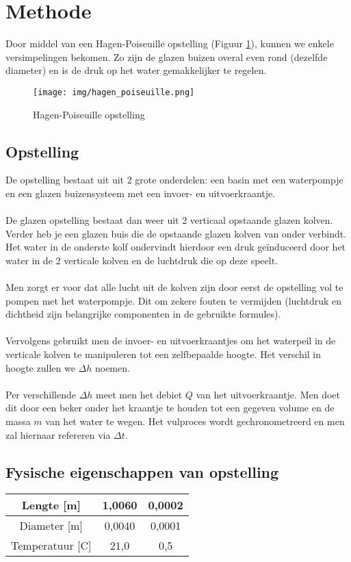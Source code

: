 \section{Methode}

Door middel van een Hagen-Poiseuille opstelling
(Figuur \ref{fig:hagen-pois}), kunnen we enkele
versimpelingen bekomen. Zo zijn de glazen buizen
overal even rond (dezelfde diameter) en is de druk
op het water gemakkelijker te regelen.

\begin{figure}[h]
    \centering
    \caption{Hagen-Poiseuille opstelling}
    \texttt{[image: img/hagen\_poiseuille.png]}
    \label{fig:hagen-pois}
\end{figure}

\subsection{Opstelling}

De opstelling bestaat uit uit 2 grote onderdelen: een basin
met een waterpompje en een glazen buizensysteem met
een invoer- en uitvoerkraantje.
\\ \\
De glazen opstelling bestaat dan weer uit 2 verticaal
opstaande glazen kolven. Verder heb je een glazen buis
die de opstaande glazen kolven van onder verbindt.
Het water in de onderste kolf ondervindt hierdoor een druk
geïnduceerd door het water in de 2 verticale kolven en de
luchtdruk die op deze speelt.
\\ \\
Men zorgt er voor dat alle lucht uit de kolven zijn door
eerst de opstelling vol te pompen met het waterpompje.
Dit om zekere fouten te vermijden (luchtdruk en dichtheid
zijn belangrijke componenten in de gebruikte formules).
\\ \\
Vervolgens gebruikt men de invoer- en uitvoerkraantjes om
het waterpeil in de verticale kolven te manipuleren tot
een zelfbepaalde hoogte. Het verschil in hoogte zullen we
$\Delta h$ noemen.
\\ \\
Per verschillende $\Delta h$ meet men het debiet $Q$ van het
uitvoerkraantje. Men doet dit door een beker onder het
kraantje te houden tot een gegeven volume en de massa $m$ van
het water te wegen. Het vulproces wordt gechronometreerd
en men zal hiernaar refereren via $\Delta t$.

\subsection{Fysische eigenschappen van opstelling}

\begin{table}[h]
    \begin{tabular}{| c | c | c |}
        \hline
        
        Lengte [m]      & 1,0060    & 0,0002 \\ \hline
        Diameter [m]    & 0,0040    & 0,0001 \\ \hline
        Temperatuur [C] & 21,0      & 0,5    \\ \hline
        
    \end{tabular}
\end{table}
